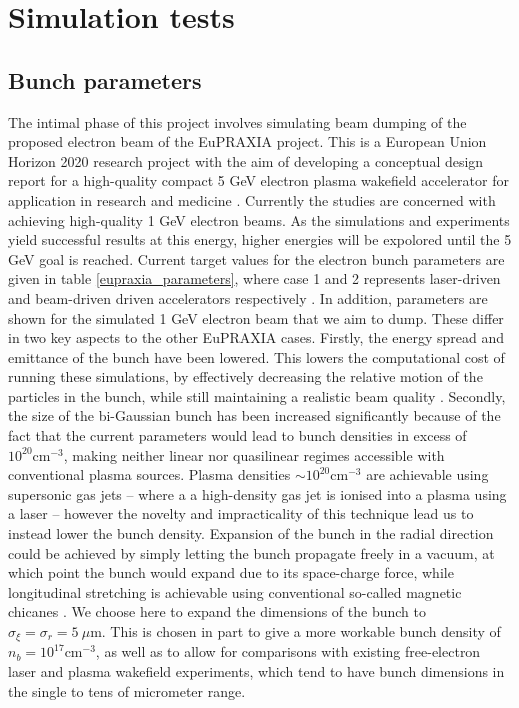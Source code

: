 \chapter{Simulation tests} %
\section{Bunch parameters}
The intimal phase of this project involves simulating beam dumping of the proposed electron beam of the EuPRAXIA project. This is a European Union Horizon 2020 research project with the aim of developing a conceptual design report for a high-quality compact 5 GeV electron plasma wakefield accelerator for application in research and medicine \cite{Eupraxia}. Currently the studies are concerned with achieving high-quality 1 GeV electron beams. As the simulations and experiments yield successful results at this energy, higher energies will be expolored until the 5 GeV goal is reached. Current target values for the electron bunch parameters are given in table \ref{eupraxia_parameters}, where case 1 and 2 represents laser-driven and beam-driven driven accelerators respectively \cite{Eupraxia}.  In addition, parameters are shown for the simulated 1 GeV electron beam that we aim to dump. These differ in two key aspects to the other EuPRAXIA cases. Firstly, the energy spread and emittance of the bunch have been lowered. This lowers the computational cost of running these simulations, by effectively decreasing the relative motion of the particles in the bunch, while still maintaining a realistic beam quality \cite{Walker2017}. Secondly, the size of the bi-Gaussian bunch has been increased significantly because of the fact that the current parameters would lead to bunch densities in excess of $10^{20} \text{cm}^{-3}$, making neither linear nor quasilinear regimes accessible with conventional plasma sources. Plasma densities $\sim 10^{20} \text{cm}^{-3}$ are achievable using supersonic gas jets \cite{Schmid2012} -- where a a high-density gas jet is ionised into a plasma using a laser -- however the novelty and impracticality of this technique lead us to instead lower the bunch density. Expansion of the bunch in the radial direction could be achieved by simply letting the bunch propagate freely in a vacuum, at which point the bunch would expand due to its space-charge force, while longitudinal stretching is achievable using conventional so-called magnetic chicanes \cite{Maier2012}. We choose here to expand the dimensions of the bunch to $\sigma_{\xi}=\sigma_r=5~\mu\text{m}$. This is chosen in part to give a more workable bunch density of $n_b=10^{17} \text{cm}^{-3}$, as well as to allow for comparisons with existing free-electron laser and plasma wakefield experiments, which tend to have bunch dimensions in the single to tens of micrometer range. \vspace{-10pt}\\
